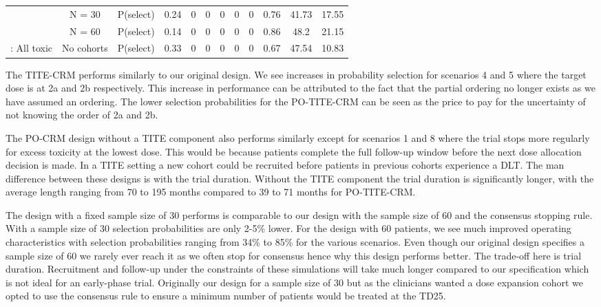 \begin{table}
\begin{singlespace}
{\begin{tabular}[t]{cccccccccccc}
				& N = 30 & P(select) & 0.24 & 0 & 0 & 0 & 0 & 0 & 0.76 & 41.73 & 17.55\\
				
				& N = 60 & P(select) & 0.14 & 0 & 0 & 0 & 0 & 0 & 0.86 & 48.2 & 21.15\\
				
				\multirow{-7}{*}{\centering\arraybackslash 8: All toxic} & No cohorts & P(select) & 0.33 & 0 & 0 & 0 & 0 & 0 & 0.67 & 47.54 & 10.83\\
				\bottomrule
		\end{tabular}}
	\end{singlespace}
\end{table}


The TITE-CRM performs similarly to our original design. We see increases in probability selection for scenarios 4 and 5 where the target dose is at 2a and 2b respectively. This increase in performance can be attributed to the fact that the partial ordering no longer exists as we have assumed an ordering. The lower selection probabilities for the PO-TITE-CRM can be seen as the price to pay for the uncertainty of not knowing the order of 2a and 2b. 

The PO-CRM design without a TITE component also performs similarly except for scenarios 1 and 8 where the trial stops more regularly for excess toxicity at the lowest dose. This would be because patients complete the full follow-up window before the next dose allocation decision is made. In a TITE setting a new cohort could be recruited before patients in previous cohorts experience a DLT. The man difference between these designs is with the trial duration. Without the TITE component the trial duration is significantly longer, with the average length ranging from 70 to 195 months compared to 39 to 71 months for PO-TITE-CRM. 

The design with a fixed sample size of 30 performs is comparable to our design with the sample size of 60 and the consensus stopping rule. With a sample size of 30 selection probabilities are only 2-5\% lower. For the design with 60 patients, we see much improved operating characteristics with selection probabilities ranging from 34\% to 85\% for the various scenarios. Even though our original design specifies a sample size of 60 we rarely ever reach it as we often stop for consensus hence why this design performs better. The trade-off here is trial duration. Recruitment and follow-up under the constraints of these simulations will take much longer compared to our specification which is not ideal for an early-phase trial. Originally our design for a sample size of 30 but as the clinicians wanted a dose expansion cohort we opted to use the consensus rule to ensure a minimum number of patients would be treated at the TD25. 

